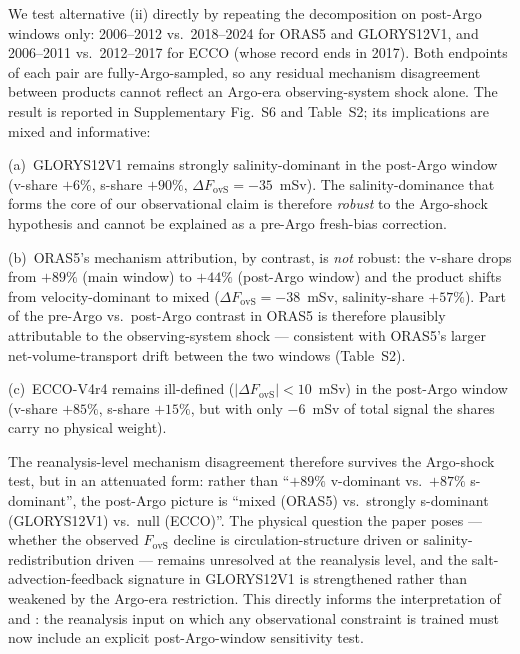 \documentclass[12pt,a4paper]{article}
\newcommand{\Fovs}{F_\mathrm{ovS}}
\begin{document}
We test alternative (ii) directly by repeating the decomposition
on post-Argo windows only: 2006--2012 vs.\ 2018--2024 for ORAS5
and GLORYS12V1, and 2006--2011 vs.\ 2012--2017 for ECCO (whose
record ends in 2017). Both endpoints of each pair are
fully-Argo-sampled, so any residual mechanism disagreement between
products cannot reflect an Argo-era observing-system shock alone.
The result is reported in Supplementary Fig.~S6 and
Table~S2; its implications are mixed and informative:

(a)~GLORYS12V1 remains strongly salinity-dominant in the post-Argo
window (v-share $+6\%$, s-share $+90\%$, $\Delta\Fovs = -35$~mSv).
The salinity-dominance that forms the core of our observational
claim is therefore \emph{robust} to the Argo-shock hypothesis and
cannot be explained as a pre-Argo fresh-bias correction.

(b)~ORAS5's mechanism attribution, by contrast, is \emph{not}
robust: the v-share drops from $+89\%$ (main window) to $+44\%$
(post-Argo window) and the product shifts from velocity-dominant
to mixed ($\Delta\Fovs = -38$~mSv, salinity-share $+57\%$). Part
of the pre-Argo vs.\ post-Argo contrast in ORAS5 is therefore
plausibly attributable to the observing-system shock --- consistent
with ORAS5's larger net-volume-transport drift between the two
windows (Table~S2).

(c)~ECCO-V4r4 remains ill-defined ($|\Delta\Fovs| < 10$~mSv) in
the post-Argo window (v-share $+85\%$, s-share $+15\%$, but with
only $-6$~mSv of total signal the shares carry no physical
weight).

The reanalysis-level mechanism disagreement therefore survives
the Argo-shock test, but in an attenuated form: rather than
``$+89\%$ v-dominant vs.\ $+87\%$ s-dominant'', the post-Argo
picture is ``mixed (ORAS5) vs.\ strongly s-dominant (GLORYS12V1)
vs.\ null (ECCO)''. The physical question the paper poses ---
whether the observed $\Fovs$ decline is circulation-structure
driven or salinity-redistribution driven --- remains unresolved at
the reanalysis level, and the salt-advection-feedback signature
in GLORYS12V1 is strengthened rather than weakened by the Argo-era
restriction. This directly informs the interpretation of
\citet{Portmann2026} and \citet{Dong2024}: the reanalysis input on
which any observational constraint is trained must now include an
explicit post-Argo-window sensitivity test.
\end{document}
